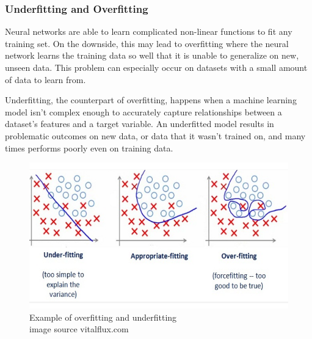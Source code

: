 \clearpage
\subsubsection{Underfitting and Overfitting}

Neural networks are able to learn complicated non-linear functions to fit any training set. On the downside, this may lead to overfitting where the neural network learns the training data so well that it is unable to generalize on new, unseen data. This problem can especially occur on datasets with a small amount of data to learn from. \par

Underfitting, the counterpart of overfitting, happens when a machine learning model isn’t complex enough to accurately capture relationships between a dataset’s features and a target variable. An underfitted model results in problematic outcomes on new data, or data that it wasn’t trained on, and many times performs poorly even on training data. \par



\begin{figure}[h]
	\caption[Example of overfitting and underfitting]{Example of overfitting and underfitting
		\\ image source vitalflux.com}
	\centering
	\includegraphics[width=1\textwidth, height=\textheight, keepaspectratio]{"resources/overfitting"}
\end{figure}


